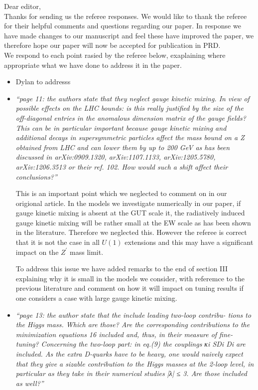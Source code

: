 \documentclass[12pt]{article}
\begin{document}
\noindent Dear editor,
\\

\noindent Thanks for sending us the referee responses. We would like to thank
the referee for their helpful comments and questions regarding our
paper. In response we have made changes to our manuscript and feel
these have improved the paper, we therefore hope our paper will now be
accepted for publication in PRD.
\\
\noindent We respond to each point rasied by the referee below, exaplaining
where appropriate what we have done to address it in the paper.


\begin{itemize}
\item Dylan to addresss

\item {\it ``page 11: the authors state that they
  neglect gauge kinetic mixing. In view of possible effects on the LHC
  bounds: is this really justified by the size of the off-diagonal
  entries in the anomalous dimension matrix of the gauge fields? This
  can be in particular important because gauge kinetic mixing and
  additional decays in supersymmetric particles affect the mass bound
  on a Z obtained from LHC and can lower them by up to 200 GeV as has
  been discussed in arXiv:0909.1320, arXiv:1107.1133, arXiv:1205.5780,
  arXiv:1206.3513 or their ref. 102. How would such a shift affect
  their conclusions?''}
 
This is an important point which we neglected to comment on in our
origional article. In the models we investigate numerically in our
paper, if gauge kinetic mixing is absent at the GUT scale it, the
radiatively induced gauge kinetic mixing will be rather small at the
EW scale as has been shown in the literature.  Therefore we neglected
this. However the referee is correct that it is not the case in all
$U(1)$ extensions and this may have a significant impact on the
$Z^\prime$ mass limit.

To address this issue we have added remarks to the end of section III
explaining why it is small in the models we consider, with referemce
to the previous literature and comment on how it will impact on tuning
results if one considers a case with large gauge kinetic mixing.

\item {\it ``page 13: the author state that the include leading
  two-loop contribu- tions to the Higgs mass. Which are those? Are the
  corresponding contributions to the minimization equations 16
  included and, thus, in their measure of fine-tuning? Concerning the
  two-loop part: in eq.(9) the couplings κi SDi Di are included. As
  the extra D-quarks have to be heavy, one would naively expect that
  they give a sizable contribution to the Higgs masses at the 2-loop
  level, in particular as they take in their numerical studies |λ| ≤
  3. Are those included as well?''}


\end{itemize}
\end{document}
